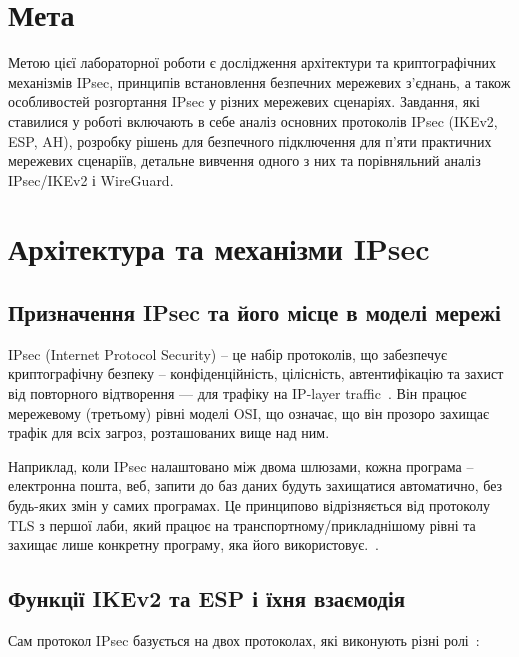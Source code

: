 \section{Мета}
\label{sec:objective}

Метою цієї лабораторної роботи є дослідження архітектури та криптографічних механізмів IPsec, принципів встановлення 
безпечних мережевих з’єднань, а також особливостей розгортання IPsec у різних мережевих сценаріях. Завдання, які 
ставилися у роботі включають в себе аналіз основних протоколів IPsec (IKEv2, ESP, AH), розробку рішень для безпечного 
підключення для п’яти практичних мережевих сценаріїв, детальне вивчення одного з них та порівняльний аналіз 
IPsec/IKEv2 і WireGuard.

\section{Архітектура та механізми IPsec}
\label{sec:task1}

\subsection*{Призначення IPsec та його місце в моделі мережі}

IPsec (Internet Protocol Security) -- це набір протоколів, що забезпечує криптографічну безпеку -- конфіденційність, 
цілісність, автентифікацію та захист від повторного відтворення — для трафіку на IP-layer traffic~\cite{rfc4301}. 
Він працює мережевому (третьому) рівні моделі OSI, що означає, що він прозоро захищає трафік для всіх загроз, 
розташованих вище над ним.

Наприклад, коли IPsec налаштовано між двома шлюзами, кожна програма -- електронна пошта, веб, запити до баз даних 
будуть захищатися автоматично, без будь-яких змін у самих програмах. Це принципово відрізняється від протоколу 
TLS з першої лаби, який працює на транспортному/прикладнішому рівні та захищає лише конкретну програму, яка його 
використовує.~\cite{cloudflare_ipsec}.

\subsection*{Функції IKEv2 та ESP і їхня взаємодія}

Сам протокол IPsec базується на двох протоколах, які виконують різні ролі~\cite{rfc7296, rfc4303}:

